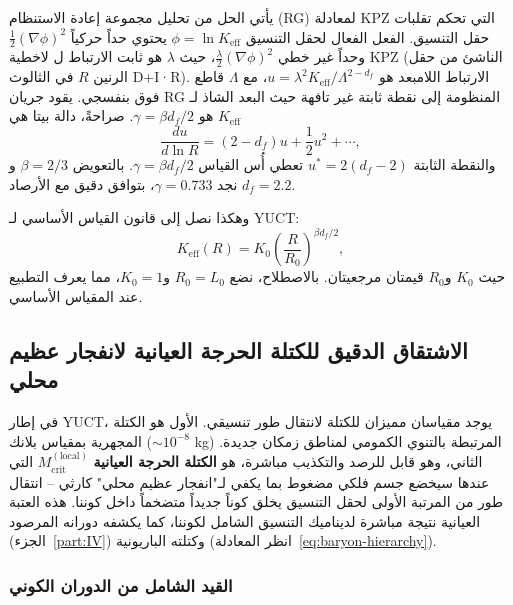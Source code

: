 \documentclass[12pt,a4paper]{article}
\newcommand{\Keff}{K_{\mathrm{eff}}}
\newcommand{\Lzero}{L_0}
\begin{document}
	يأتي الحل من تحليل مجموعة إعادة الاستنظام (RG) لمعادلة KPZ التي تحكم تقلبات حقل التنسيق. الفعل الفعال لحقل التنسيق \(\phi = \ln \Keff\) يحتوي حداً حركياً \(\frac{1}{2}(\nabla \phi)^2\) وحداً غير خطي \(\frac{\lambda}{2}(\nabla \phi)^2\)، حيث \(\lambda\) هو ثابت الارتباط ل لاخطية KPZ (الناشئ من حقل الرنين \(R\) في الثالوث D+I·R). الارتباط اللامبعد هو \(u = \lambda^2 \Keff / \Lambda^{2-d_f}\)، مع \(\Lambda\) قاطع فوق بنفسجي. يقود جريان RG المنظومة إلى نقطة ثابتة غير تافهة حيث البعد الشاذ لـ \(\Keff\) هو \(\gamma = \beta d_f / 2\). صراحةً، دالة بيتا هي
	\[
	\frac{du}{d\ln R} = (2 - d_f) u + \frac{1}{2} u^2 + \cdots,
	\]
	والنقطة الثابتة \(u^* = 2(d_f - 2)\) تعطي أُس القياس \(\gamma = \beta d_f / 2\). بالتعويض \(\beta = 2/3\) و\(d_f = 2.2\) نجد \(\gamma = 0.733\)، بتوافق دقيق مع الأرصاد.
	
	وهكذا نصل إلى قانون القياس الأساسي لـ YUCT:
	\begin{equation}
		\Keff(R) = K_0 \left( \frac{R}{R_0} \right)^{\beta d_f / 2},
		\label{eq:keff-scaling}
	\end{equation}
	حيث \(K_0\) و\(R_0\) قيمتان مرجعيتان. بالاصطلاح، نضع \(R_0 = \Lzero\) و\(K_0 = 1\)، مما يعرف التطبيع عند المقياس الأساسي.
	
	\subsection{الاشتقاق الدقيق للكتلة الحرجة العيانية لانفجار عظيم محلي}
	\label{subsec:Mcrit-macroscopic}
	
	في إطار YUCT، يوجد مقياسان مميزان للكتلة لانتقال طور تنسيقي. الأول هو الكتلة المجهرية بمقياس بلانك (\(\sim 10^{-8}\) kg) المرتبطة بالتنوي الكمومي لمناطق زمكان جديدة. الثاني، وهو قابل للرصد والتكذيب مباشرة، هو \textbf{الكتلة الحرجة العيانية} \(M_{\mathrm{crit}}^{\mathrm{(local)}}\) التي عندها سيخضع جسم فلكي مضغوط بما يكفي لـ"انفجار عظيم محلي" كارثي – انتقال طور من المرتبة الأولى لحقل التنسيق يخلق كوناً جديداً متضخماً داخل كوننا. هذه العتبة العيانية نتيجة مباشرة لديناميك التنسيق الشامل لكوننا، كما يكشفه دورانه المرصود (الجزء~\ref{part:IV}) وكتلته الباريونية (انظر المعادلة~\ref{eq:baryon-hierarchy}).
	
	\subsubsection{القيد الشامل من الدوران الكوني}
	
\end{document}

